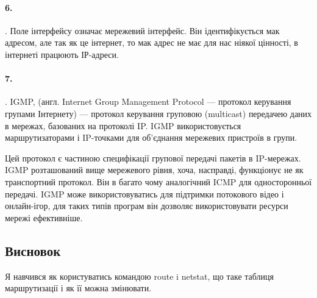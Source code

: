 \documentclass[12pt]{extarticle}
\begin{document}
\paragraph{6.}.
Поле інтерфейсу означає мережевий інтерфейс. Він ідентифікується мак адресом,
але так як це інтернет, то мак адрес не має для нас ніякої цінності, в інтернеті 
працюють ІР-адреси.

\paragraph{7.}.
IGMP, (англ. Internet Group Management Protocol — протокол керування групами Інтернету) — протокол керування груповою (multicast) передачею даних в мережах, базованих на протоколі IP. IGMP використовується маршрутизаторами і IP-точками для об'єднання мережевих пристроїв в групи.

Цей протокол є частиною специфікації групової передачі пакетів в IP-мережах. IGMP розташований вище мережевого рівня, хоча, насправді, функціонує не як транспортний протокол. Він в багато чому аналогічний ICMP для односторонньої передачі. IGMP може використовуватись для підтримки потокового відео і онлайн-ігор, для таких типів програм він дозволяє використовувати ресурси мережі ефективніше. 

\vspace{12pt}

\subsection*{Висновок} 
Я навчився як користуватись командою route i netstat, що таке таблиця 
маршрутизації і як її можна змінювати.
\end{document}
